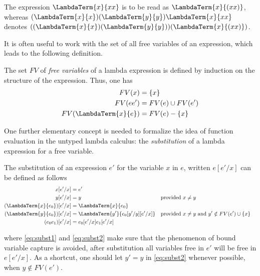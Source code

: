 \begin{expl}
The expression $\LambdaTerm{x}{xx}$ is to be read as $\LambdaTerm{x}{(xx)}$,
whereas $(\LambdaTerm{x}{x})(\LambdaTerm{y}{y})\LambdaTerm{x}{xx}$ denotes 
$((\LambdaTerm{x}{x})(\LambdaTerm{y}{y}))(\LambdaTerm{x}{(xx)})$.
\end{expl}

It is often useful
to work with the set of all free variables of an expression, which leads to the 
following definition.
\begin{defn}
The set $FV$ of \emph{free variables} of a lambda expression is defined by
induction on the structure of the expression. Thus, one has
\begin{equation}
\begin{split}
 FV(x) ={} & \{x\}\\
 FV(ee') ={}& FV(e) \cup FV(e')\\
 FV(\LambdaTerm{x}{e}) ={}& FV(e) - \{x\}
\end{split}
\end{equation}
\end{defn}

One further elementary concept is needed to formalize the idea of function
evaluation in the untyped lambda calculus: the \emph{substitution} of a lambda
expression for a free variable. 
\begin{defn}
The substitution of an expression $e'$ for the
variable $x$ in $e$, written $e[e'/x]$ can be defined as follows
\begin{align}
  x[e'/x] &= e'\\
  y[e'/x] &= y   && \text{provided } x \neq y\\
  (\LambdaTerm{x}{e_0})[e'/x] &= \LambdaTerm{x}{e_0} \label{eq:subst1}\\
  (\LambdaTerm{y}{e_0})[e'/x] &=  \LambdaTerm{y'}{e_0[y'/y][e'/x]} &&
  \text{provided } x \neq y \text{ and } y' \notin FV(e') \cup \{x\}  \label{eq:subst2}\\
  (e_0 e_1)[e'/x] &= e_0[e'/x] e_1[e'/x]
\end{align}

where \eqref{eq:subst1} and \eqref{eq:subst2} make sure that the phenomenon of
bound variable capture is avoided, \IE after substitution all variables free in
$e'$ will be free in $e[e'/x]$. As a shortcut, one should let $y' = y$ in
\eqref{eq:subst2} whenever possible, \IE when $y \notin FV(e')$. 
\end{defn}


